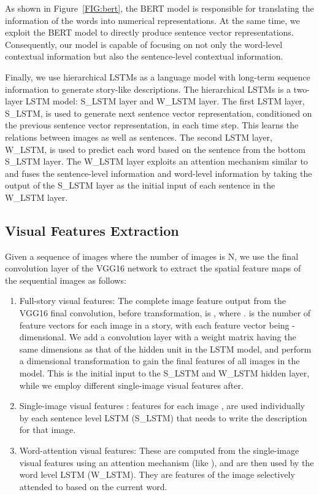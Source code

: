 \documentclass[a4paper,fleqn]{cas-sc}
\begin{document}
As shown in Figure~\ref{FIG:bert}, the BERT model is responsible for translating the information of the words into numerical representations. At the same time, we exploit the BERT model to directly produce sentence vector representations. Consequently, our model is capable of focusing on not only the word-level contextual information but also the sentence-level contextual information.

Finally, we use hierarchical LSTMs as a language model with  long-term sequence information to generate  story-like descriptions. The hierarchical LSTMs is a two-layer LSTM model: S\_LSTM layer and W\_LSTM layer. The first LSTM layer, S\_LSTM, is used to generate next sentence vector representation, conditioned on the previous sentence vector representation, in each time step. This learns the relations between images as well as sentences. The second LSTM layer,  W\_LSTM, is used to predict each word based on the sentence from the bottom S\_LSTM layer. The W\_LSTM layer exploits an attention mechanism similar to \citet{Xu2015Show} and fuses the sentence-level information and word-level information by taking the output of the S\_LSTM layer as the initial input of each sentence in the W\_LSTM layer.

\subsection{Visual Features Extraction}
Given a sequence of images where the number of images is N, we use the final convolution layer of the VGG16 network to extract the spatial feature maps of the sequential images as follows:
\begin{enumerate}
    \item Full-story visual features: The complete image feature output from the VGG16 final convolution, before transformation, is ,  where .  is the number of feature vectors for each image in a story, with each feature vector being -dimensional.
    We add a convolution layer with a weight matrix  having the same dimensions as that of the hidden unit in the LSTM model, and perform a dimensional transformation to gain the final features of all  images in the model. This is the  initial input to the S\_LSTM and W\_LSTM hidden layer, while we employ  different single-image visual features after. 
    \item Single-image visual features : features for each image , are used individually by each sentence level LSTM (S\_LSTM) that needs to write the description for that image.
    \item Word-attention visual features: These are computed from the single-image visual features using an attention mechanism (like \citet{Xu2015Show}), and are then used by the word level LSTM (W\_LSTM). They are features of the image selectively attended to based on the current word.
\end{enumerate}
\end{document}
